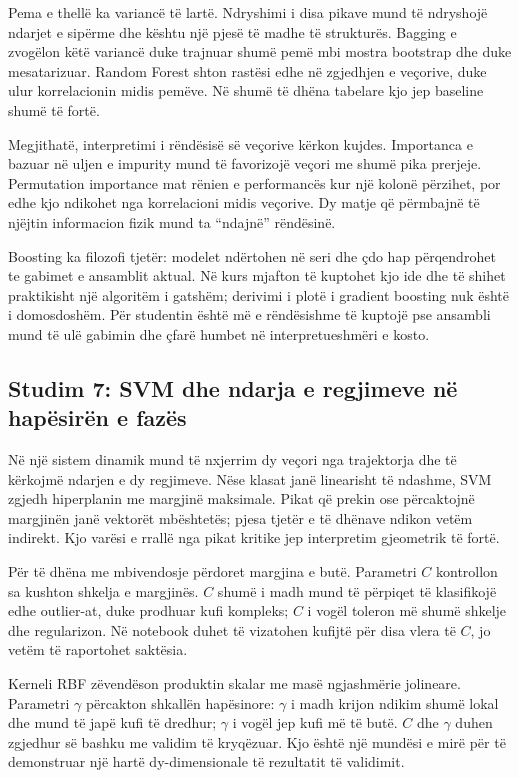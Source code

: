 \documentclass[12pt,a4paper,oneside]{book}
\begin{document}
Pema e thellë ka variancë të lartë. Ndryshimi i disa pikave mund të ndryshojë ndarjet e sipërme dhe kështu një pjesë të madhe të strukturës. Bagging e zvogëlon këtë variancë duke trajnuar shumë pemë mbi mostra bootstrap dhe duke mesatarizuar. Random Forest shton rastësi edhe në zgjedhjen e veçorive, duke ulur korrelacionin midis pemëve. Në shumë të dhëna tabelare kjo jep baseline shumë të fortë.

Megjithatë, interpretimi i rëndësisë së veçorive kërkon kujdes. Importanca e bazuar në uljen e impurity mund të favorizojë veçori me shumë pika prerjeje. Permutation importance mat rënien e performancës kur një kolonë përzihet, por edhe kjo ndikohet nga korrelacioni midis veçorive. Dy matje që përmbajnë të njëjtin informacion fizik mund ta “ndajnë” rëndësinë.

Boosting ka filozofi tjetër: modelet ndërtohen në seri dhe çdo hap përqendrohet te gabimet e ansamblit aktual. Në kurs mjafton të kuptohet kjo ide dhe të shihet praktikisht një algoritëm i gatshëm; derivimi i plotë i gradient boosting nuk është i domosdoshëm. Për studentin është më e rëndësishme të kuptojë pse ansambli mund të ulë gabimin dhe çfarë humbet në interpretueshmëri e kosto.

\subsection*{Studim 7: SVM dhe ndarja e regjimeve në hapësirën e fazës}
Në një sistem dinamik mund të nxjerrim dy veçori nga trajektorja dhe të kërkojmë ndarjen e dy regjimeve. Nëse klasat janë linearisht të ndashme, SVM zgjedh hiperplanin me margjinë maksimale. Pikat që prekin ose përcaktojnë margjinën janë vektorët mbështetës; pjesa tjetër e të dhënave ndikon vetëm indirekt. Kjo varësi e rrallë nga pikat kritike jep interpretim gjeometrik të fortë.

Për të dhëna me mbivendosje përdoret margjina e butë. Parametri $C$ kontrollon sa kushton shkelja e margjinës. $C$ shumë i madh mund të përpiqet të klasifikojë edhe outlier-at, duke prodhuar kufi kompleks; $C$ i vogël toleron më shumë shkelje dhe regularizon. Në notebook duhet të vizatohen kufijtë për disa vlera të $C$, jo vetëm të raportohet saktësia.

Kerneli RBF zëvendëson produktin skalar me masë ngjashmërie jolineare. Parametri $\gamma$ përcakton shkallën hapësinore: $\gamma$ i madh krijon ndikim shumë lokal dhe mund të japë kufi të dredhur; $\gamma$ i vogël jep kufi më të butë. $C$ dhe $\gamma$ duhen zgjedhur së bashku me validim të kryqëzuar. Kjo është një mundësi e mirë për të demonstruar një hartë dy-dimensionale të rezultatit të validimit.
\end{document}

